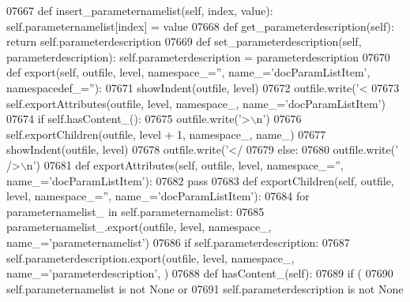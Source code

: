 \begin{DoxyCode}
{{{{{{{{{{{{{{{{{{{{{{{{{{{{{{{{{{{{{{{{{{{{{{{{{{{{{{{{{{{{{{{{{{{{{{{{{{{{{{{{{{{{{{{{{{{{{{{{{{{{{{{{{{{{{{{{{{{{{{{{{{{{{{{{{{{{{{{{{{{{{{{{{{{{{{{{{{{{{{{{{{{{{{{{{{{{{{{{{{{{{{{{{{{{{{{{{{{{{{{{{{{{{{{{{{{{{{{{{{{{{{{{{{{{{{{{{{{{{{{{{{{{{{{{{{{{{{{{{{{{{{{{{{{{{{{{{{{{{{{{{{{{{{{{{{{{{{{{{{{{{{{{{{{{{{{{{{{{{{{{{{{{{{{{{{{{{{{{{{{{{{{{{{{{{{{{{{{{{{{{{{{{{{{{{{{{{{{{{{{{{{{{{{{{{{{{{{{{{{{{{{{{{{{{{{{{{{{{{{{{{{{{{{{{{{{{{{{{{{{{{{{{{{{{{{{{{{{{{{{{{{{{{{{{{{{{{{{{{{07667     \textcolor{keyword}{def }insert_parameternamelist(self, index, value): self.parameternamelist[index] = value
07668     \textcolor{keyword}{def }get_parameterdescription(self): \textcolor{keywordflow}{return} self.parameterdescription
07669     \textcolor{keyword}{def }set_parameterdescription(self, parameterdescription): self.parameterdescription = 
      parameterdescription
07670     \textcolor{keyword}{def }export(self, outfile, level, namespace\_='', name\_='docParamListItem', namespacedef\_=''):
07671         showIndent(outfile, level)
07672         outfile.write(\textcolor{stringliteral}{'<%
07673         self.exportAttributes(outfile, level, namespace\_, name\_=\textcolor{stringliteral}{'docParamListItem'})
07674         \textcolor{keywordflow}{if} self.hasContent_():
07675             outfile.write(\textcolor{stringliteral}{'>\(\backslash\)n'})
07676             self.exportChildren(outfile, level + 1, namespace\_, name\_)
07677             showIndent(outfile, level)
07678             outfile.write(\textcolor{stringliteral}{'</%
07679         \textcolor{keywordflow}{else}:
07680             outfile.write(\textcolor{stringliteral}{' />\(\backslash\)n'})
07681     \textcolor{keyword}{def }exportAttributes(self, outfile, level, namespace\_='', name\_='docParamListItem'):
07682         \textcolor{keywordflow}{pass}
07683     \textcolor{keyword}{def }exportChildren(self, outfile, level, namespace\_='', name\_='docParamListItem'):
07684         \textcolor{keywordflow}{for} parameternamelist\_ \textcolor{keywordflow}{in} self.parameternamelist:
07685             parameternamelist\_.export(outfile, level, namespace\_, name\_=\textcolor{stringliteral}{'parameternamelist'})
07686         \textcolor{keywordflow}{if} self.parameterdescription:
07687             self.parameterdescription.export(outfile, level, namespace\_, name\_=\textcolor{stringliteral}{'parameterdescription'}, )
07688     \textcolor{keyword}{def }hasContent_(self):
07689         \textcolor{keywordflow}{if} (
07690             self.parameternamelist \textcolor{keywordflow}{is} \textcolor{keywordflow}{not} \textcolor{keywordtype}{None} \textcolor{keywordflow}{or}
07691             self.parameterdescription \textcolor{keywordflow}{is} \textcolor{keywordflow}{not} \textcolor{keywordtype}{None}
}}}}}}}}}}}}}}}}}}}}}}}}}}}}}}}}}}}}}}}}}}}}}}}}}}}}}}}}}}}}}}}}}}}}}}}}}}}}}}}}}}}}}}}}}}}}}}}}}}}}}}}}}}}}}}}}}}}}}}}}}}}}}}}}}}}}}}}}}}}}}}}}}}}}}}}}}}}}}}}}}}}}}}}}}}}}}}}}}}}}}}}}}}}}}}}}}}}}}}}}}}}}}}}}}}}}}}}}}}}}}}}}}}}}}}}}}}}}}}}}}}}}}}}}}}}}}}}}}}}}}}}}}}}}}}}}}}}}}}}}}}}}}}}}}}}}}}}}}}}}}}}}}}}}}}}}}}}}}}}}}}}}}}}}}}}}}}}}}}}}}}}}}}}}}}}}}}}}}}}}}}}}}}}}}}}}}}}}}}}}}}}}}}}}}}}}}}}}}}}}}}}}}}}}}}}}}}}}}}}}}}}}}}}}}}}}}}}}}}}}}}}}}}}}}}}}}}}}}}}}}}}}}}}}}}}}}}}}}}}}
\end{DoxyCode}

